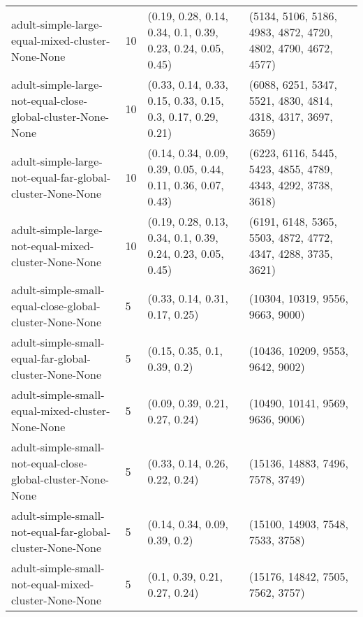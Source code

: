 \begin{longtable}{llll}
                                       adult-simple-large-equal-mixed-cluster-None-None &             10 &  (0.19, 0.28, 0.14, 0.34, 0.1, 0.39, 0.23, 0.24, 0.05, 0.45) & (5134, 5106, 5186, 4983, 4872, 4720, 4802, 4790, 4672, 4577) \\
                            adult-simple-large-not-equal-close-global-cluster-None-None &             10 &  (0.33, 0.14, 0.33, 0.15, 0.33, 0.15, 0.3, 0.17, 0.29, 0.21) & (6088, 6251, 5347, 5521, 4830, 4814, 4318, 4317, 3697, 3659) \\
                              adult-simple-large-not-equal-far-global-cluster-None-None &             10 & (0.14, 0.34, 0.09, 0.39, 0.05, 0.44, 0.11, 0.36, 0.07, 0.43) & (6223, 6116, 5445, 5423, 4855, 4789, 4343, 4292, 3738, 3618) \\
                                   adult-simple-large-not-equal-mixed-cluster-None-None &             10 &  (0.19, 0.28, 0.13, 0.34, 0.1, 0.39, 0.24, 0.23, 0.05, 0.45) & (6191, 6148, 5365, 5503, 4872, 4772, 4347, 4288, 3735, 3621) \\
                                adult-simple-small-equal-close-global-cluster-None-None &              5 &                               (0.33, 0.14, 0.31, 0.17, 0.25) &                             (10304, 10319, 9556, 9663, 9000) \\
                                  adult-simple-small-equal-far-global-cluster-None-None &              5 &                                 (0.15, 0.35, 0.1, 0.39, 0.2) &                             (10436, 10209, 9553, 9642, 9002) \\
                                       adult-simple-small-equal-mixed-cluster-None-None &              5 &                               (0.09, 0.39, 0.21, 0.27, 0.24) &                             (10490, 10141, 9569, 9636, 9006) \\
                            adult-simple-small-not-equal-close-global-cluster-None-None &              5 &                               (0.33, 0.14, 0.26, 0.22, 0.24) &                             (15136, 14883, 7496, 7578, 3749) \\
                              adult-simple-small-not-equal-far-global-cluster-None-None &              5 &                                (0.14, 0.34, 0.09, 0.39, 0.2) &                             (15100, 14903, 7548, 7533, 3758) \\
                                   adult-simple-small-not-equal-mixed-cluster-None-None &              5 &                                (0.1, 0.39, 0.21, 0.27, 0.24) &                             (15176, 14842, 7505, 7562, 3757) \\

\end{longtable}
